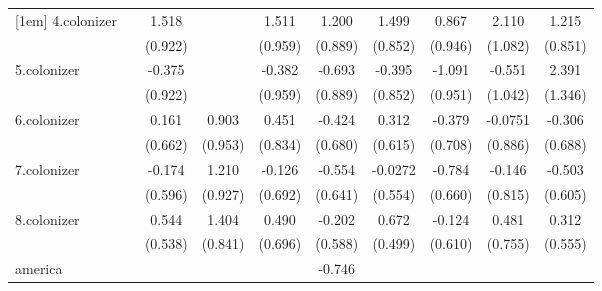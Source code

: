 {\begin{tabular}{l*{9}{c}}
[1em]
4.colonizer &                     &       1.518         &                     &       1.511         &       1.200         &       1.499         &       0.867         &       2.110         &       1.215         \\
            &                     &     (0.922)         &                     &     (0.959)         &     (0.889)         &     (0.852)         &     (0.946)         &     (1.082)         &     (0.851)         \\
[1em]
5.colonizer &                     &      -0.375         &                     &      -0.382         &      -0.693         &      -0.395         &      -1.091         &      -0.551         &       2.391         \\
            &                     &     (0.922)         &                     &     (0.959)         &     (0.889)         &     (0.852)         &     (0.951)         &     (1.042)         &     (1.346)         \\
[1em]
6.colonizer &                     &       0.161         &       0.903         &       0.451         &      -0.424         &       0.312         &      -0.379         &     -0.0751         &      -0.306         \\
            &                     &     (0.662)         &     (0.953)         &     (0.834)         &     (0.680)         &     (0.615)         &     (0.708)         &     (0.886)         &     (0.688)         \\
[1em]
7.colonizer &                     &      -0.174         &       1.210         &      -0.126         &      -0.554         &     -0.0272         &      -0.784         &      -0.146         &      -0.503         \\
            &                     &     (0.596)         &     (0.927)         &     (0.692)         &     (0.641)         &     (0.554)         &     (0.660)         &     (0.815)         &     (0.605)         \\
[1em]
8.colonizer &                     &       0.544         &       1.404         &       0.490         &      -0.202         &       0.672         &      -0.124         &       0.481         &       0.312         \\
            &                     &     (0.538)         &     (0.841)         &     (0.696)         &     (0.588)         &     (0.499)         &     (0.610)         &     (0.755)         &     (0.555)         \\
[1em]
america     &                     &                     &                     &                     &      -0.746         &                     &                     &                     &                     \\

\end{tabular}}
